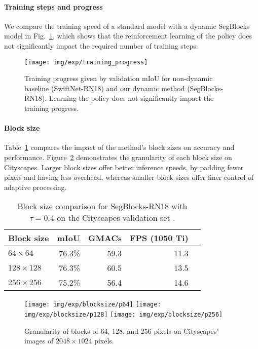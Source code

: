 \paragraph*{\textbf{Training steps and progress}}
We compare the training speed of a standard model with a dynamic SegBlocks model in Fig.~\ref{fig:training_progress}, which shows that the reinforcement learning of the policy does not significantly impact the required number of training steps.

\begin{figure}[tb]
\centering
\texttt{[image: img/exp/training\_progress]}
\caption{Training progress given by validation mIoU for non-dynamic baseline (SwiftNet-RN18) and our dynamic method (SegBlocks-RN18). Learning the policy does not significantly impact the training progress.} 

\label{fig:training_progress}
\end{figure}


\paragraph*{\textbf{Block size}}
Table~\ref{tab:blocksize} compares the impact of the method's block sizes on accuracy and performance. Figure~\ref{fig:blocksize} demonstrates the granularity of each block size on Cityscapes. Larger block sizes offer better inference speeds, by padding fewer pixels and having less overhead, whereas smaller block sizes offer finer control of adaptive processing.


\begin{table}[!tb]
\scriptsize
\caption{Block size comparison for SegBlocks-RN18 with $\tau{=}0.4$ on the Cityscapes validation set \label{tab:blocksize}.}
\centering
\begin{tabular}{@{}lrrrr@{}}
\toprule
\textbf{Block size} & \textbf{mIoU} & \textbf{GMACs} & \textbf{FPS (1050 Ti)} \\ \midrule
$64{\times}64$ & 76.3\% & 59.3 & 11.3 \\
$128{\times}128$ & 76.3\% & 60.5 & 13.5\\
$256{\times}256$ & 75.2\% & 56.4 & 14.6\\
\bottomrule
\end{tabular}
\end{table}

\begin{figure}[!tb]
\centering
  \texttt{[image: img/exp/blocksize/p64]}
   \texttt{[image: img/exp/blocksize/p128]}
  \texttt{[image: img/exp/blocksize/p256]}
\caption{Granularity of blocks of 64, 128, and 256 pixels on Cityscapes' images of $2048{\times}1024$ pixels.}
\label{fig:blocksize}
\end{figure}



